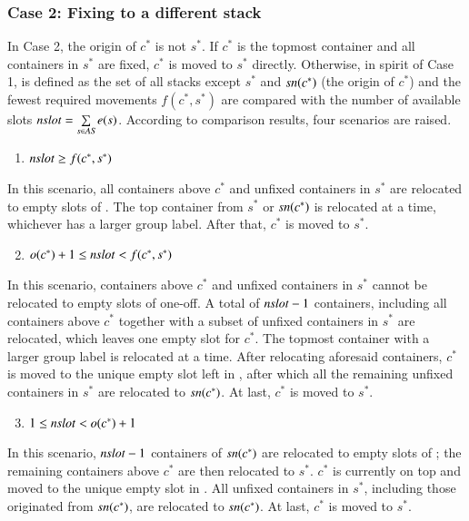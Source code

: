 \documentclass[review,3p,times,authoryear,12pt]{elsarticle}
\begin{document}
\subsubsection{Case 2: Fixing to a different stack}
In Case 2, the origin of $c^*$ is not $s^*$. If $c^*$ is the topmost container and all containers in $s^*$ are fixed, $c^*$ is moved to $s^*$ directly. Otherwise, in spirit of Case 1,  is defined as the set of all stacks except $s^*$ and $\id{sn}(c^*)$ (the origin of $c^*$) and the fewest required movements $f(c^*,s^*)$ are compared with the number of available slots $\id{nslot}=\sum\limits_{s\in \id{AS}}e(s)$. According to comparison results, four scenarios are raised.
\begin{enumerate}
\setcounter{enumi}{0}
\item $\id{nslot}\ge f(c^*,s^*)$
\end{enumerate}
In this scenario, all containers above $c^*$ and unfixed containers in $s^*$ are relocated to empty slots of . The top container from $s^*$ or $\id{sn}(c^*)$ is relocated at a time, whichever has a larger group label. After that, $c^*$ is moved to $s^*$.

\begin{enumerate}
\setcounter{enumi}{1}
\item $o(c^*)+1\le\id{nslot}< f(c^*,s^*)$
\end{enumerate}
In this scenario, containers above $c^*$ and unfixed containers in $s^*$ cannot be relocated to empty slots of  one-off. A total of $\id{nslot}-1$ containers, including all containers above $c^*$ together with a subset of unfixed containers in $s^*$ are relocated, which leaves one empty slot for $c^*$. The topmost container with a larger group label is relocated at a time. After relocating aforesaid containers, $c^*$ is moved to the unique empty slot left in , after which all the remaining unfixed containers in $s^*$ are relocated to $\id{sn}(c^*)$. At last, $c^*$ is moved to $s^*$.

\begin{enumerate}
\setcounter{enumi}{2}
\item $1\le\id{nslot}< o(c^*)+1$
\end{enumerate}
In this scenario, $\id{nslot}-1$ containers of $\id{sn}(c^*)$ are relocated to empty slots of ; the remaining containers above $c^*$ are then relocated to $s^*$. $c^*$ is currently on top and moved to the unique empty slot in . All unfixed containers in $s^*$, including those originated from $\id{sn}(c^*)$, are relocated to $\id{sn}(c^*)$. At last, $c^*$ is moved to $s^*$.
\end{document}
